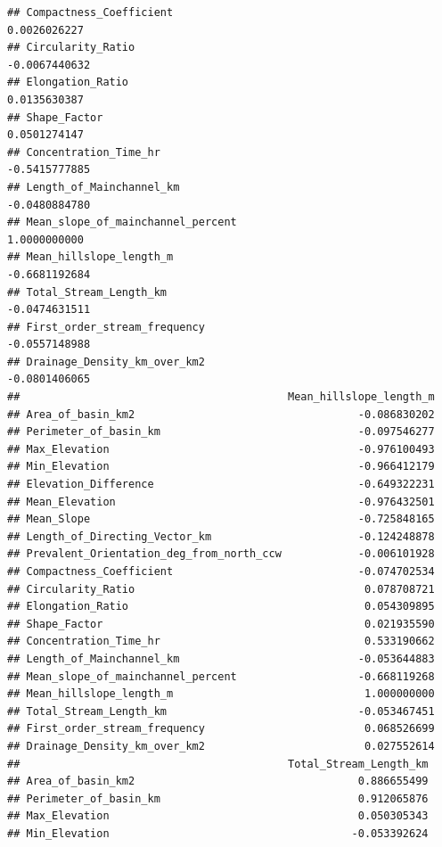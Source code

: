 \documentclass[11pt,]{article}
\begin{document}
\begin{verbatim}
## Compactness_Coefficient                                       0.0026026227
## Circularity_Ratio                                            -0.0067440632
## Elongation_Ratio                                              0.0135630387
## Shape_Factor                                                  0.0501274147
## Concentration_Time_hr                                        -0.5415777885
## Length_of_Mainchannel_km                                     -0.0480884780
## Mean_slope_of_mainchannel_percent                             1.0000000000
## Mean_hillslope_length_m                                      -0.6681192684
## Total_Stream_Length_km                                       -0.0474631511
## First_order_stream_frequency                                 -0.0557148988
## Drainage_Density_km_over_km2                                 -0.0801406065
##                                          Mean_hillslope_length_m
## Area_of_basin_km2                                   -0.086830202
## Perimeter_of_basin_km                               -0.097546277
## Max_Elevation                                       -0.976100493
## Min_Elevation                                       -0.966412179
## Elevation_Difference                                -0.649322231
## Mean_Elevation                                      -0.976432501
## Mean_Slope                                          -0.725848165
## Length_of_Directing_Vector_km                       -0.124248878
## Prevalent_Orientation_deg_from_north_ccw            -0.006101928
## Compactness_Coefficient                             -0.074702534
## Circularity_Ratio                                    0.078708721
## Elongation_Ratio                                     0.054309895
## Shape_Factor                                         0.021935590
## Concentration_Time_hr                                0.533190662
## Length_of_Mainchannel_km                            -0.053644883
## Mean_slope_of_mainchannel_percent                   -0.668119268
## Mean_hillslope_length_m                              1.000000000
## Total_Stream_Length_km                              -0.053467451
## First_order_stream_frequency                         0.068526699
## Drainage_Density_km_over_km2                         0.027552614
##                                          Total_Stream_Length_km
## Area_of_basin_km2                                   0.886655499
## Perimeter_of_basin_km                               0.912065876
## Max_Elevation                                       0.050305343
## Min_Elevation                                      -0.053392624

\end{verbatim}
\end{document}
